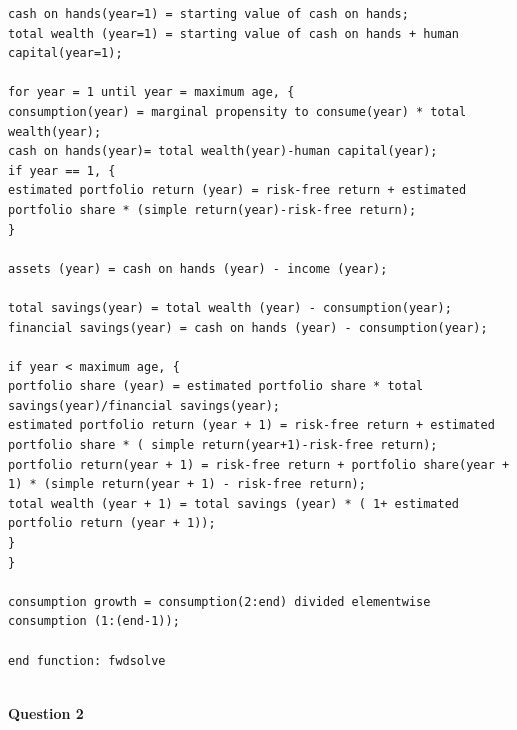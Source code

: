\documentclass[a4paper,9pt, parskip=half-]{scrartcl}
\begin{document}
\begin{lstlisting}[frame=single]
cash on hands(year=1) = starting value of cash on hands;
total wealth (year=1) = starting value of cash on hands + human capital(year=1);

for year = 1 until year = maximum age, {
consumption(year) = marginal propensity to consume(year) * total wealth(year);
cash on hands(year)= total wealth(year)-human capital(year);
if year == 1, {
estimated portfolio return (year) = risk-free return + estimated portfolio share * (simple return(year)-risk-free return);
}

assets (year) = cash on hands (year) - income (year);

total savings(year) = total wealth (year) - consumption(year);
financial savings(year) = cash on hands (year) - consumption(year);

if year < maximum age, {
portfolio share (year) = estimated portfolio share * total savings(year)/financial savings(year);
estimated portfolio return (year + 1) = risk-free return + estimated portfolio share * ( simple return(year+1)-risk-free return);
portfolio return(year + 1) = risk-free return + portfolio share(year + 1) * (simple return(year + 1) - risk-free return);
total wealth (year + 1) = total savings (year) * ( 1+ estimated portfolio return (year + 1));
}
}

consumption growth = consumption(2:end) divided elementwise consumption (1:(end-1));

end function: fwdsolve


\end{lstlisting}


\textbf{Question 2}\\
\end{document}
